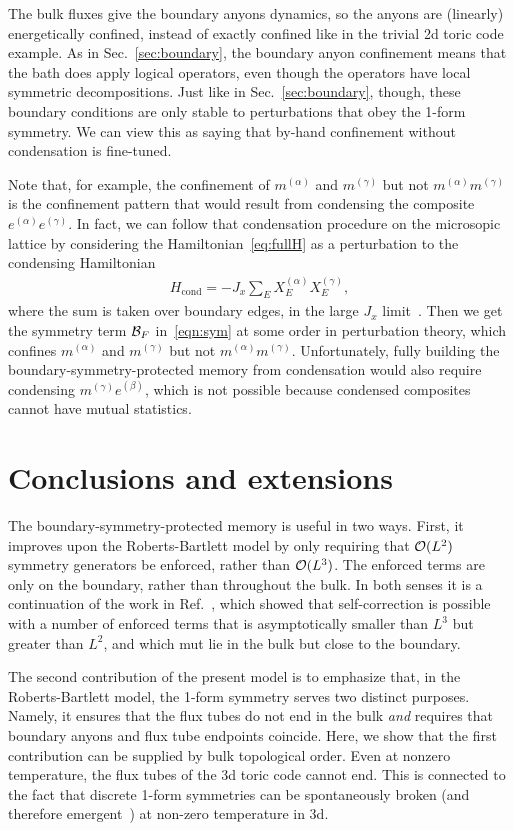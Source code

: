 The bulk fluxes give the boundary anyons dynamics, so the anyons are (linearly) energetically confined, instead of exactly confined like in the trivial 2d toric code example.
As in Sec.~\ref{sec:boundary}, the boundary anyon confinement means that the bath does apply logical operators, even though the operators have local symmetric decompositions. Just like in Sec.~\ref{sec:boundary}, though, these boundary conditions are only stable to perturbations that obey the 1-form symmetry. 
We can view this as saying that by-hand confinement without condensation is fine-tuned.

Note that, for example, the confinement of $m^{(\alpha)}$ and $m^{(\gamma)}$ but not $m^{(\alpha)}m^{(\gamma)}$ is the confinement pattern that would result from condensing the composite $e^{(\alpha)}e^{(\gamma)}$. In fact, we can follow that condensation procedure on the microsopic lattice by considering the Hamiltonian~\eqref{eq:fullH} as a perturbation to the condensing Hamiltonian 
\begin{align}
H_\text{cond} = -J_x \sum_{E}X_E^{(\alpha)}X_E^{(\gamma)},
\end{align}
where the sum is taken over boundary edges, in the large $J_x$ limit~\cite{Ma2017Coupled}. Then we get the symmetry term $\cal{B}_F$ in~\eqref{eqn:sym} at some order in perturbation theory, which confines $m^{(\alpha)}$ and $m^{(\gamma)}$ but not $m^{(\alpha)}m^{(\gamma)}$. Unfortunately, fully building the boundary-symmetry-protected memory from condensation would also require condensing $m^{(\gamma)}e^{(\beta)}$, which is not possible because condensed composites cannot have mutual statistics. 

\section{Conclusions and extensions} \label{sec:conc}

The boundary-symmetry-protected memory is useful in two ways. First, it improves upon the Roberts-Bartlett model by only requiring that $\cal{O}(L^2)$ symmetry generators be enforced, rather than $\cal{O}(L^3)$. The enforced terms are only on the boundary, rather than throughout the bulk. In both senses it is a continuation of the work in Ref.~\cite{StahlNandkishore2021}, which showed that self-correction is possible with a number of enforced terms that is asymptotically smaller than $L^3$ but greater than $L^2$, and which mut lie in the bulk but close to the boundary.

The second contribution of the present model is to emphasize that, in the Roberts-Bartlett model, the 1-form symmetry serves two distinct purposes. Namely, it ensures that the flux tubes do not end in the bulk \emph{and} requires that boundary anyons and flux tube endpoints coincide. Here, we show that the first contribution can be supplied by bulk topological order. Even at nonzero temperature, the flux tubes of the 3d toric code cannot end. This is connected to the fact that discrete 1-form symmetries can be spontaneously broken (and therefore emergent~\cite{Wen2019Higher}) at non-zero temperature in 3d.

